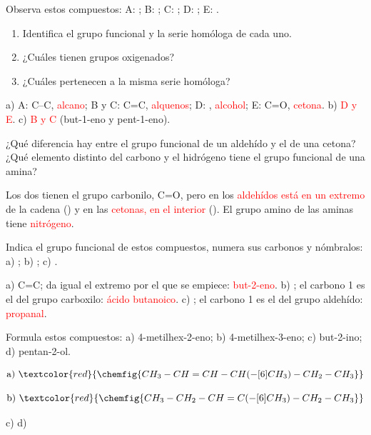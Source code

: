 \begin{exercise}
    Observa estos compuestos: A: ; B: ; C: ; D: ; E: .
    \begin{enumerate}[label=\alph*)]
        \item Identifica el grupo funcional y la serie homóloga de cada uno.
        \item ¿Cuáles tienen grupos oxigenados?
        \item ¿Cuáles pertenecen a la misma serie homóloga?
    \end{enumerate}
    \begin{solu}
        a) A: C--C, \textcolor{red}{alcano}; B y C: C=C, \textcolor{red}{alquenos}; D: , \textcolor{red}{alcohol}; E: C=O, \textcolor{red}{cetona}.
        b) \textcolor{red}{D y E}. c) \textcolor{red}{B y C} (but-1-eno y pent-1-eno).
    \end{solu}
\end{exercise}

\begin{exercise}
    ¿Qué diferencia hay entre el grupo funcional de un aldehído y el de una cetona? ¿Qué elemento distinto del carbono y el hidrógeno tiene el grupo funcional de una amina?
    \begin{solu}
        Los dos tienen el grupo carbonilo, C=O, pero en los \textcolor{red}{aldehídos está en un extremo} de la cadena () y en las \textcolor{red}{cetonas, en el interior} (). El grupo amino de las aminas tiene \textcolor{red}{nitrógeno}.
    \end{solu}
\end{exercise}

\begin{exercise}
    Indica el grupo funcional de estos compuestos, numera sus carbonos y nómbralos: a) ; b) ; c) .
    \begin{solu}
        a) C=C; da igual el extremo por el que se empiece: \textcolor{red}{but-2-eno}.
        b) ; el carbono 1 es el del grupo carboxilo: \textcolor{red}{ácido butanoico}.
        c) ; el carbono 1 es el del grupo aldehído: \textcolor{red}{propanal}.
    \end{solu}
\end{exercise}

\begin{exercise}
    Formula estos compuestos: a) 4-metilhex-2-eno; b) 4-metilhex-3-eno; c) but-2-ino; d) pentan-2-ol.
    \begin{solu}
        \[ \text{a)}\ \textcolor{red}{\chemfig{CH_3-CH=CH-CH(-[6]CH_3)-CH_2-CH_3}} \]

        \[ \text{b)}\ \textcolor{red}{\chemfig{CH_3-CH_2-CH=C(-[6]CH_3)-CH_2-CH_3}} \]

        c) \textcolor{red}{} \qquad d) \textcolor{red}{}
    \end{solu}
\end{exercise}

